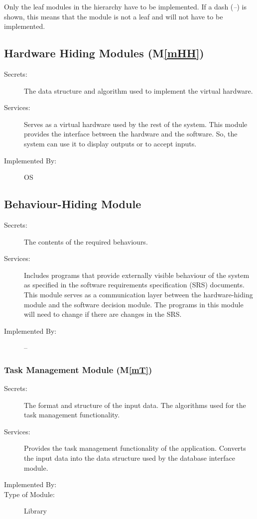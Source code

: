 \documentclass[12pt, titlepage]{article}
\newcommand{\mref}[1]{M\ref{#1}}
\begin{document}
Only the leaf modules in the hierarchy have to be implemented. If a dash
(\emph{--}) is shown, this means that the module is not a leaf and will not have
to be implemented.

\subsection{Hardware Hiding Modules (\mref{mHH})}

\begin{description}
\item[Secrets:]The data structure and algorithm used to implement the virtual
  hardware.
\item[Services:]Serves as a virtual hardware used by the rest of the
  system. This module provides the interface between the hardware and the
  software. So, the system can use it to display outputs or to accept inputs.
\item[Implemented By:] OS
\end{description}

\subsection{Behaviour-Hiding Module}

\begin{description}
\item[Secrets:]The contents of the required behaviours.
\item[Services:]Includes programs that provide externally visible behaviour of
  the system as specified in the software requirements specification (SRS)
  documents. This module serves as a communication layer between the
  hardware-hiding module and the software decision module. The programs in this
  module will need to change if there are changes in the SRS.
\item[Implemented By:] --
\end{description}


\subsubsection{Task Management Module (\mref{mT})}

\begin{description}
\item[Secrets:]The format and structure of the input data. The algorithms used for the task management functionality.
\item[Services:] Provides the task management functionality of the application. Converts the input data into the data structure used by the database interface module. 
\item[Implemented By:] \progname{}
\item[Type of Module:] Library
\end{description}
\end{document}
